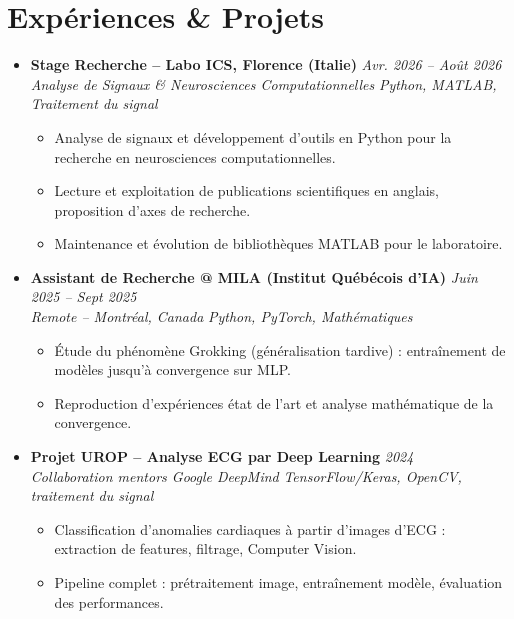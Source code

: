 \documentclass[a4paper,11pt]{article}
\begin{document}
\section{Expériences \& Projets}
\begin{itemize}[leftmargin=*, label={-}]

\item \textbf{Stage Recherche -- Labo ICS, Florence (Italie)} \hfill \textit{Avr. 2026 -- Août 2026} \\
\textit{Analyse de Signaux \& Neurosciences Computationnelles} \hfill \textit{Python, MATLAB, Traitement du signal}
\vspace{-2pt}
    \begin{itemize}[leftmargin=0.4cm, nosep, label=\tiny$\bullet$]
        \item \small{Analyse de signaux et développement d'outils en Python pour la recherche en neurosciences computationnelles.}
        \item \small{Lecture et exploitation de publications scientifiques en anglais, proposition d'axes de recherche.}
        \item \small{Maintenance et évolution de bibliothèques MATLAB pour le laboratoire.}
    \end{itemize}
\vspace{3pt}

\item \textbf{Assistant de Recherche @ MILA (Institut Québécois d'IA)} \hfill \textit{Juin 2025 -- Sept 2025} \\
\textit{Remote -- Montréal, Canada} \hfill \textit{Python, PyTorch, Mathématiques}
\vspace{-2pt}
    \begin{itemize}[leftmargin=0.4cm, nosep, label=\tiny$\bullet$]
        \item \small{Étude du phénomène Grokking (généralisation tardive) : entraînement de modèles jusqu'à convergence sur MLP.}
        \item \small{Reproduction d'expériences état de l'art et analyse mathématique de la convergence.}
    \end{itemize}
\vspace{3pt}

\item \textbf{Projet UROP -- Analyse ECG par Deep Learning} \hfill \textit{2024} \\
\textit{Collaboration mentors Google DeepMind} \hfill \textit{TensorFlow/Keras, OpenCV, traitement du signal}
\vspace{-2pt}
    \begin{itemize}[leftmargin=0.4cm, nosep, label=\tiny$\bullet$]
        \item \small{Classification d'anomalies cardiaques à partir d'images d'ECG : extraction de features, filtrage, Computer Vision.}
        \item \small{Pipeline complet : prétraitement image, entraînement modèle, évaluation des performances.}
    \end{itemize}
\vspace{3pt}


\end{itemize}
\end{document}
